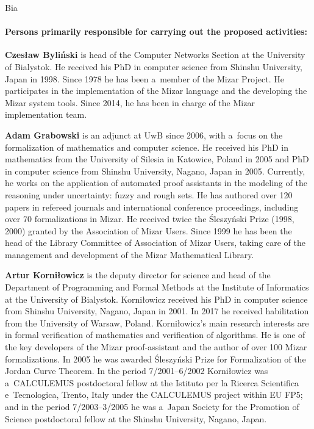 \begin{sitedescription}{Bia}
\paragraph*{Persons primarily responsible for carrying out the proposed activities:}

\begin{compactitem}

\item\textbf{Czesław Byliński} is head of the Computer Networks Section at the University of Bialystok.
He received his PhD in computer science from Shinshu University, Japan in 1998.
Since 1978 he has been a~member of the Mizar Project.
He participates in the implementation of the Mizar language and the developing the Mizar system tools. 
Since 2014, he has been in charge of the Mizar implementation team.

\item\textbf{Adam Grabowski} is an adjunct at UwB since 2006, 
with a~focus on the formalization of mathematics and computer science.
He received his PhD in mathematics from the University of Silesia in Katowice, Poland in 2005 
and PhD in computer science from Shinshu University, Nagano, Japan in 2005.
Currently, he works on the application of automated proof assistants
in the modeling of the reasoning under uncertainty: fuzzy and rough sets.
He has authored over 120 papers in refereed journals and international conference
proceedings, including over 70 formalizations in Mizar.
He received twice the Śleszyński Prize (1998, 2000) granted by the Association of Mizar Users.
Since 1999 he has been the head of the Library Committee of Association of Mizar Users, taking care of
the management and development of the Mizar Mathematical Library.

\item\textbf{Artur Korniłowicz} is the deputy director for science 
and head of the Department of Programming and Formal Methods
at the Institute of Informatics at the University of Bialystok.
Korniłowicz received his PhD in computer science from Shinshu University, Nagano, Japan in 2001.
In 2017 he received habilitation from the University of Warsaw, Poland.
Korniłowicz's main research interests are in formal verification of mathematics and verification of algorithms.
He is one of the key developers of the Mizar proof-assistant and the author of over 100 Mizar formalizations.
In 2005 he was awarded Śleszyński Prize for Formalization of the Jordan Curve Theorem.
In the period 7/2001--6/2002 Korniłowicz was a~CALCULEMUS postdoctoral fellow
at the Istituto per la Ricerca Scientifica e~Tecnologica, Trento, Italy under the CALCULEMUS project within EU FP5;
and in the period 7/2003--3/2005 he was a~Japan Society for the Promotion of Science 
postdoctoral fellow at the Shinshu University, Nagano, Japan.


\end{compactitem}
\end{sitedescription}
